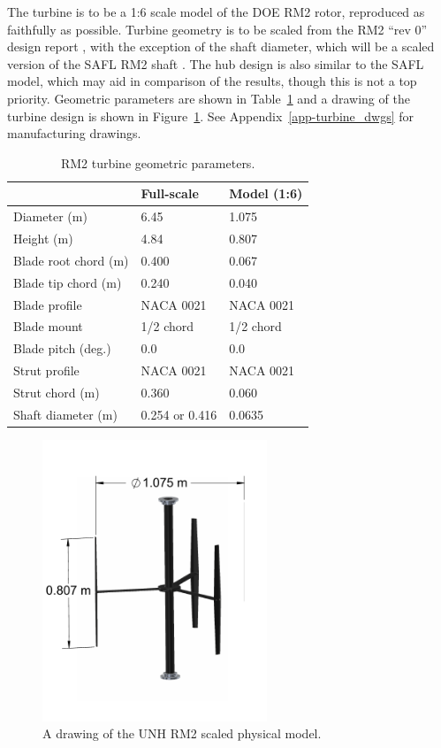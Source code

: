 \documentclass[12pt]{report}
\begin{document}
The turbine is to be a 1:6 scale model of the DOE RM2 rotor, reproduced as
faithfully as possible. Turbine geometry is to be scaled from the RM2 ``rev 0''
design report \cite{Barone2011}, with the exception of the shaft diameter, which
will be a scaled version of the SAFL RM2 shaft \cite{Hill2014}. The hub design
is also similar to the SAFL model, which may aid in comparison of the results,
though this is not a top priority. Geometric parameters are shown in
Table~\ref{tab-turb_geom} and a drawing of the turbine design is shown in
Figure~\ref{fig-turbine_drawing}. See Appendix~\ref{app-turbine_dwgs} for
manufacturing drawings.

\begin{table}[ht]
\centering
\begin{tabular}{l|l|l}
   & Full-scale & Model (1:6) \\
\hline 
Diameter (m)   & 6.45 & 1.075 \\ 
Height (m)     & 4.84 & 0.807 \\ 
Blade root chord (m) & 0.400 & 0.067 \\ 
Blade tip chord (m)  & 0.240 & 0.040 \\ 
Blade profile & NACA 0021 & NACA 0021 \\ 
Blade mount & 1/2 chord & 1/2 chord \\ 
Blade pitch (deg.) & 0.0 & 0.0 \\ 
Strut profile & NACA 0021 & NACA 0021 \\ 
Strut chord (m) & 0.360 & 0.060 \\ 
Shaft diameter (m) & 0.254 \cite{Beam2011} or 0.416 \cite{Hill2014} & 0.0635\\ 
\end{tabular}
\caption{RM2 turbine geometric parameters.}
\label{tab-turb_geom}
\end{table}


\begin{figure}
\centering
\includegraphics[width=0.6\textwidth]{Figures/turbine}
\caption{A drawing of the UNH RM2 scaled physical model.}
\label{fig-turbine_drawing}
\end{figure}
\end{document}
